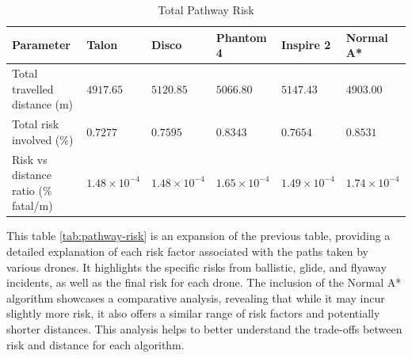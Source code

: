 \documentclass[12pt]{report}
\begin{document}
        \begin{table}[H]
            \caption{Total Pathway Risk} %
            \centering
            \begin{tabular}{| l  l  l  l  l  l |}
                \hline
                \textbf{Parameter} & \textbf{Talon} & \textbf{Disco} & \textbf{Phantom 4} & \textbf{Inspire 2} & \textbf{Normal A*} \\
                \hline
                Total travelled distance (m) & \(4917.65\) & \(5120.85\) & \(5066.80\) & \(5147.43\) & \(4903.00\) \\
                Total risk involved (\%) & \(0.7277\) & \(0.7595\) & \(0.8343\) & \(0.7654\) & \(0.8531\) \\
                Risk vs distance ratio (\% fatal/m) & \(1.48 \times 10^{-4}\) & \(1.48 \times 10^{-4}\) & \(1.65 \times 10^{-4}\) & \(1.49 \times 10^{-4}\) & \(1.74 \times 10^{-4}\) \\
                \hline
            \end{tabular}
            \label{tab:total-pathway-risk}
        \end{table}

    This table  \ref{tab:pathway-risk} is an expansion of the previous table, providing a detailed
    explanation of each risk factor associated with the paths taken by various drones. It highlights the specific risks
    from ballistic, glide, and flyaway incidents, as well as the final risk for each drone. The inclusion of the Normal
    A* algorithm showcases a comparative analysis, revealing that while it may incur slightly more risk, it also offers
    a similar range of risk factors and potentially shorter distances. This analysis helps to better understand the
    trade-offs between risk and distance for each algorithm.
\end{document}
